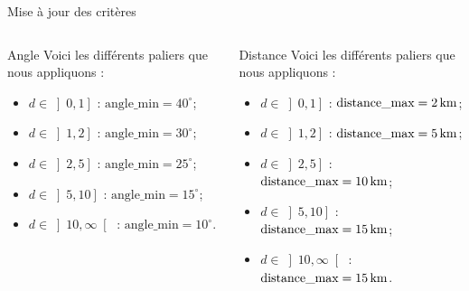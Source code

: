 \begin{frame}{Mise à jour des critères}
    \begin{columns}
        \begin{column}{0.4\paperwidth}
            \begin{block}{Angle}
                Voici les différents paliers que nous appliquons :
                \begin{itemize}
                    \item $d\in\left]0, 1\right]$ : $\text{angle\_min}=40^\circ$;
                    \item $d\in\left]1, 2\right]$ : $\text{angle\_min}=30^\circ$;
                    \item $d\in\left]2, 5\right]$ : $\text{angle\_min}=25^\circ$;
                    \item $d\in\left]5, 10\right]$ : $\text{angle\_min}=15^\circ$;
                    \item $d\in\left]10, \infty\right[$ : $\text{angle\_min}=10^\circ$.
                \end{itemize}
            \end{block}
        \end{column}
        \begin{column}{0.4\paperwidth}
            \begin{block}{Distance}
                Voici les différents paliers que nous appliquons :
                \begin{itemize}
                    \item $d\in\left]0, 1\right]$ : $\text{distance\_max}=\unit[2]{km}$;
                    \item $d\in\left]1, 2\right]$ : $\text{distance\_max}=\unit[5]{km}$;
                    \item $d\in\left]2, 5\right]$ : $\text{distance\_max}=\unit[10]{km}$;
                    \item $d\in\left]5, 10\right]$ : $\text{distance\_max}=\unit[15]{km}$;
                    \item $d\in\left]10, \infty\right[$ : $\text{distance\_max}=\unit[15]{km}$.
                \end{itemize}
            \end{block}
        \end{column}
    \end{columns}
\end{frame}
